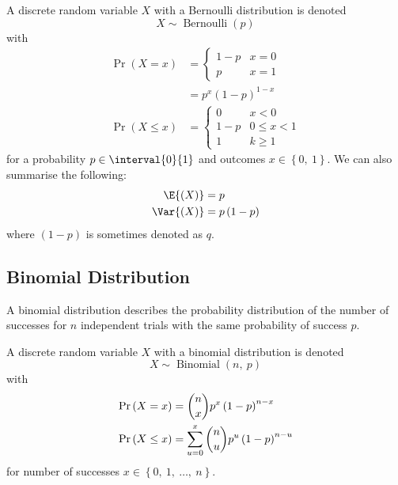 \documentclass{article}
\begin{document}
A discrete random variable \(X\) with a Bernoulli distribution is denoted
\begin{equation*}
    X \sim \operatorname{Bernoulli}{\left( p \right)}
\end{equation*}
with
\begin{align*}
    \Pr{\left( X = x \right)}    & = \begin{cases}
                                         1 - p & x = 0 \\
                                         p     & x = 1
                                     \end{cases}                    \\
                                 & = p^x \left( 1 - p \right)^{1 - x} \\
    \Pr{\left( X \leq x \right)} & = \begin{cases}
                                         0     & x < 0        \\
                                         1 - p & 0 \leq x < 1 \\
                                         1     & k \geq 1
                                     \end{cases}
\end{align*}
for a probability \(p \in \interval{0}{1}\) and outcomes \(x \in \left\{ 0,\: 1 \right\}\).
We can also summarise the following:
\begin{align*}
    \E{\left( X \right)}   & = p                      \\
    \Var{\left( X \right)} & = p \left( 1 - p \right)
\end{align*}
where \(\left( 1 - p \right)\) is sometimes denoted as \(q\).
\subsection{Binomial Distribution}
A binomial distribution describes the probability distribution of the number of successes
for \(n\) independent trials with the same probability of success \(p\).

A discrete random variable \(X\) with a binomial distribution is denoted
\begin{equation*}
    X \sim \operatorname{Binomial}{\left( n,\: p \right)}
\end{equation*}
with
\begin{align*}
    \Pr{\left( X = x \right)}    & = \dbinom{n}{x} p^x \left( 1 - p \right)^{n - x}                \\
    \Pr{\left( X \leq x \right)} & = \sum_{u = 0}^x \dbinom{n}{u} p^u \left( 1 - p \right)^{n - u}
\end{align*}
for number of successes \(x \in \left\{ 0,\: 1,\: \dots,\: n \right\}\).
\end{document}
